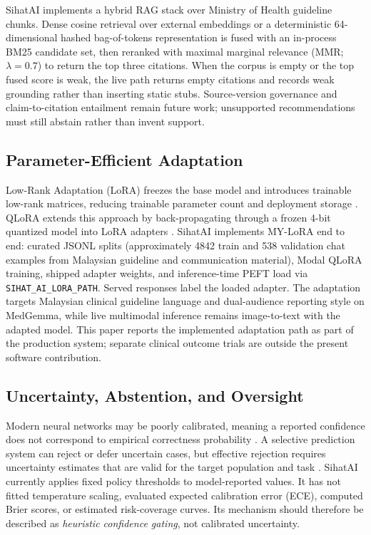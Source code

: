 \documentclass[conference]{IEEEtran}
\begin{document}
SihatAI implements a hybrid RAG stack over Ministry of Health guideline chunks. Dense cosine retrieval over external embeddings or a deterministic 64-dimensional hashed bag-of-tokens representation is fused with an in-process BM25 candidate set, then reranked with maximal marginal relevance (MMR; \(\lambda=0.7\)) to return the top three citations. When the corpus is empty or the top fused score is weak, the live path returns empty citations and records weak grounding rather than inserting static stubs. Source-version governance and claim-to-citation entailment remain future work; unsupported recommendations must still abstain rather than invent support.

\subsection{Parameter-Efficient Adaptation}

Low-Rank Adaptation (LoRA) freezes the base model and introduces trainable low-rank matrices, reducing trainable parameter count and deployment storage \cite{hu2022lora}. QLoRA extends this approach by back-propagating through a frozen 4-bit quantized model into LoRA adapters \cite{dettmers2023qlora}. SihatAI implements MY-LoRA end to end: curated JSONL splits (approximately 4842 train and 538 validation chat examples from Malaysian guideline and communication material), Modal QLoRA training, shipped adapter weights, and inference-time PEFT load via \texttt{SIHAT\_AI\_LORA\_PATH}. Served responses label the loaded adapter. The adaptation targets Malaysian clinical guideline language and dual-audience reporting style on MedGemma, while live multimodal inference remains image-to-text with the adapted model. This paper reports the implemented adaptation path as part of the production system; separate clinical outcome trials are outside the present software contribution.

\subsection{Uncertainty, Abstention, and Oversight}

Modern neural networks may be poorly calibrated, meaning a reported confidence does not correspond to empirical correctness probability \cite{guo2017calibration}. A selective prediction system can reject or defer uncertain cases, but effective rejection requires uncertainty estimates that are valid for the target population and task \cite{geifman2019selectivenet}. SihatAI currently applies fixed policy thresholds to model-reported values. It has not fitted temperature scaling, evaluated expected calibration error (ECE), computed Brier scores, or estimated risk-coverage curves. Its mechanism should therefore be described as \emph{heuristic confidence gating}, not calibrated uncertainty.
\end{document}
